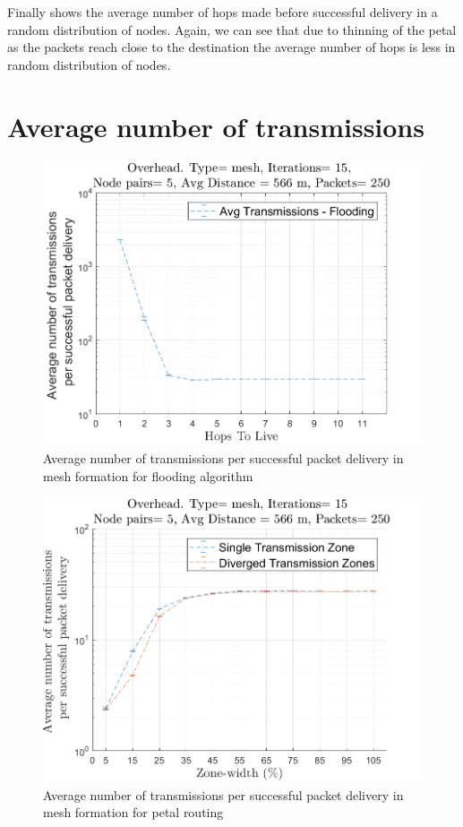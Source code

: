 Finally  shows the average number of hops made before successful delivery in a random distribution of nodes. Again, we can see that due to thinning of the petal as the packets reach close to the destination the average number of hops is less in random distribution of nodes.

\section{Average number of transmissions}

\begin{figure}[hbtp]
\centering
\includegraphics[width=\simResultFigSize\textwidth,height=\textheight,keepaspectratio]{ncsuthesis-0.6/Chapter-5/figs/fl_trans_mesh.png}
\caption{Average number of transmissions per successful packet delivery in mesh formation for flooding algorithm}
\label{fig:fl_trans_mesh}
\end{figure}

\begin{figure}[hbtp]
\centering
\includegraphics[width=\simResultFigSize\textwidth,height=\textheight,keepaspectratio]{ncsuthesis-0.6/Chapter-5/figs/pe_trans_mesh.png}
\caption{Average number of transmissions per successful packet delivery in mesh formation for petal routing}
\label{fig:pe_trans_mesh}
\end{figure}

